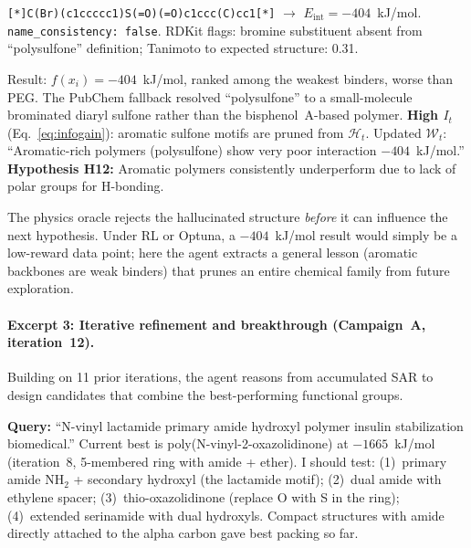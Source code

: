 \documentclass[twocolumn]{fairmeta}
\begin{document}
\begin{toolcall}
\scriptsize
\texttt{[*]C(Br)(c1ccccc1)S(=O)(=O)c1ccc(C)cc1[*]} $\to$ $E_\text{int} = -404$~kJ/mol.
\texttt{name\_consistency: false}. RDKit flags: bromine substituent absent from ``polysulfone'' definition; Tanimoto to expected structure: 0.31.
\end{toolcall}

\begin{observation}
\scriptsize
Result: $f(x_i) = -404$~kJ/mol, ranked among the weakest binders, worse than PEG.
The PubChem fallback resolved ``polysulfone'' to a small-molecule brominated diaryl sulfone rather than the bisphenol~A-based polymer.
\textbf{High $I_t$} (Eq.~\ref{eq:infogain}): aromatic sulfone motifs are pruned from $\mathcal{H}_t$.
Updated $\mathcal{W}_t$: ``Aromatic-rich polymers (polysulfone) show very poor interaction $-404$~kJ/mol.''
\textbf{Hypothesis H12:} Aromatic polymers consistently underperform due to lack of polar groups for H-bonding.
\end{observation}

\noindent The physics oracle rejects the hallucinated structure \emph{before} it can influence the next hypothesis.
Under RL or Optuna, a $-404$~kJ/mol result would simply be a low-reward data point; here the agent extracts a general lesson (aromatic backbones are weak binders) that prunes an entire chemical family from future exploration.

\paragraph{Excerpt 3: Iterative refinement and breakthrough (Campaign~A, iteration~12).}
Building on 11 prior iterations, the agent reasons from accumulated SAR to design candidates that combine the best-performing functional groups.

\begin{agentthought}
\scriptsize
\textbf{Query:} ``N-vinyl lactamide primary amide hydroxyl polymer insulin stabilization biomedical.''
Current best is poly(N-vinyl-2-oxazolidinone) at $-1665$~kJ/mol (iteration~8, 5-membered ring with amide + ether).
I should test: (1)~primary amide NH$_2$ + secondary hydroxyl (the lactamide motif); (2)~dual amide with ethylene spacer; (3)~thio-oxazolidinone (replace O with S in the ring); (4)~extended serinamide with dual hydroxyls.
Compact structures with amide directly attached to the alpha carbon gave best packing so far.
\end{agentthought}
\end{document}
